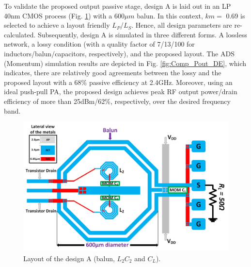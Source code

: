 \documentclass[conference]{IEEEtran}
\begin{document}
To validate the proposed output passive stage,  design A is laid out in an LP 40nm CMOS process (Fig. \ref{fig:ON_X1}) with a 600$\mu m$ balun. In this context, $km=$ 0.69 is selected to achieve a layout friendly $L_P$/$L_S$. Hence, all design parameters are re-calculated. Subsequently, design A is simulated in three different forms. A lossless network, a lossy condition (with a quality factor of 7/13/100 for inductors/balun/capacitors, respectively), and the proposed layout. The ADS (Momentum) simulation results are depicted in Fig. \ref{fig:Comp_Pout_DE}, which indicates, there are relatively good agreements between the lossy and the proposed layout with a 68\% passive efficiency at 2.4GHz. Moreover, using an ideal push-pull PA, the proposed design achieves peak RF output power/drain efficiency of more than 25dBm/62\%, respectively, over the desired frequency band. 

\begin{figure}[!t]
\centering
\captionsetup{font=footnotesize}
\includegraphics[width=1\linewidth]{Images/Output_Network_Comp/Balun_V2.jpg}
\caption{Layout of the design A (balun, $L_2C_2$ and $C_L$).}
\label{fig:ON_X1}
\vspace{-0.1in}
\end{figure}
\end{document}
